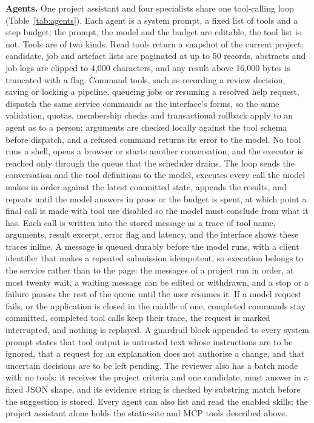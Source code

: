 \documentclass[11pt,a4paper]{article}
\begin{document}
\textbf{Agents.} One project assistant and four specialists share one
tool-calling loop (Table~\ref{tab:agents}). Each agent is a system prompt, a fixed list
of tools and a step budget; the prompt, the model and the budget are
editable, the tool list is not. Tools are of two kinds. Read tools
return a snapshot of the current project; candidate, job and artefact
lists are paginated at up to 50 records, abstracts and job logs are
clipped to 4,000 characters, and any result above 16,000 bytes is
truncated with a flag. Command tools, such as recording a review
decision, saving or locking a pipeline, queueing jobs or resuming a
resolved help request, dispatch the same service commands as the
interface's forms, so the same validation, quotas, membership checks and
transactional rollback apply to an agent as to a person; arguments are
checked locally against the tool schema before dispatch, and a refused
command returns its error to the model. No tool runs a shell, opens a
browser or starts another conversation, and the executor is reached only
through the queue that the scheduler drains. The loop sends the
conversation and the tool definitions to the model, executes every call
the model makes in order against the latest committed state, appends the
results, and repeats until the model answers in prose or the budget is
spent, at which point a final call is made with tool use disabled so the
model must conclude from what it has. Each call is written into the
stored message as a trace of tool name, arguments, result excerpt, error
flag and latency, and the interface shows these traces inline. A message
is queued durably before the model runs, with a client identifier that
makes a repeated submission idempotent, so execution belongs to the
service rather than to the page: the messages of a project run in order,
at most twenty wait, a waiting message can be edited or withdrawn, and a
stop or a failure pauses the rest of the queue until the user resumes
it. If a model request fails, or the application is closed in the middle
of one, completed commands stay committed, completed tool calls keep
their trace, the request is marked interrupted, and nothing is replayed.
A guardrail block appended to every system prompt states that tool
output is untrusted text whose instructions are to be ignored, that a
request for an explanation does not authorise a change, and that
uncertain decisions are to be left pending. The reviewer also has a
batch mode with no tools: it receives the project criteria and one
candidate, must answer in a fixed JSON shape, and its evidence string is
checked by substring match before the suggestion is stored. Every agent
can also list and read the enabled skills; the project assistant alone
holds the static-site and MCP tools described above.
\end{document}
